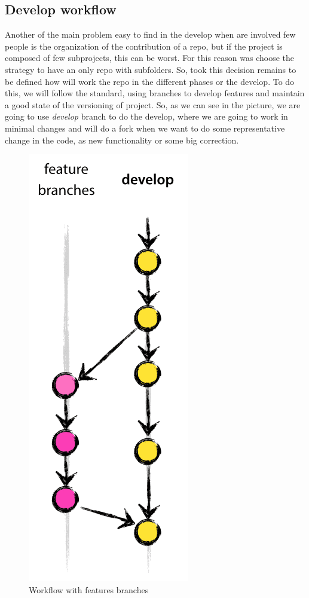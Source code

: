 \subsection{Develop workflow}

Another of the main problem easy to find in the develop when are involved
few people is the organization of the contribution of a repo, but if the project
is composed of few subprojects, this can be worst. For this reason was choose the
strategy to have an only repo with subfolders.
So, took this decision remains to be defined how will work the repo in the
different phases or the develop.
\intro
To do this, we will follow the standard, using branches to develop features and
maintain a good state of the versioning of project.
\intro
So, as we can see in the picture, we are going to use \textit{develop} branch
to do the develop, where we are going to work in minimal changes and will do
a fork when we want to do some representative change in the code, as new functionality or
some big correction.


\begin{figure}[H]
  \includegraphics[scale=0.25]{img/git/feature_branches.png}
  \centering
  \caption{Workflow with features branches}
\end{figure}

